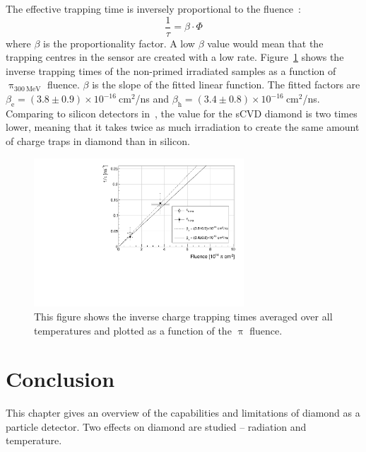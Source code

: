 The effective trapping time is inversely proportional to the fluence~\cite{Bates2005113}:
\begin{equation}
\label{eq:ltfactor}
\frac{1}{\tau} = \beta\cdot\Phi
\end{equation} 
where $\beta$ is the proportionality factor. A low $\beta$ value would mean that the trapping centres in the sensor are created with a low rate. Figure~\ref{fig:lifetimevsdose} shows the inverse trapping times of the non-primed irradiated samples as a function of $\uppi_\mathrm{300~MeV}$ fluence. $\beta$ is the slope of the fitted linear function. The fitted factors are $\beta_\mathrm{e}=(3.8\pm0.9)\times10^{-16}~$cm$^2$/ns and $\beta_\mathrm{h}=(3.4\pm0.8)\times10^{-16}~$cm$^2$/ns. Comparing to silicon detectors in~\cite{Bates2005113}, the value for the sCVD diamond is two times lower, meaning that it takes twice as much irradiation to create the same amount of charge traps in diamond than in silicon.

 


\begin{figure}[!t]
\centering
\includegraphics[width=0.7\textwidth]{03_measurement_results/scripts/plots/taunew/avglifetime1} 
\caption{This figure shows the inverse charge trapping times averaged over all temperatures and plotted as a function of the $\uppi$ fluence.}
\label{fig:lifetimevsdose}
\end{figure}








\clearpage
\section{Conclusion}
\label{sec:radlimit}
This chapter gives an overview of the capabilities and limitations of diamond as a particle detector. Two effects on diamond are studied -- radiation and temperature. 

